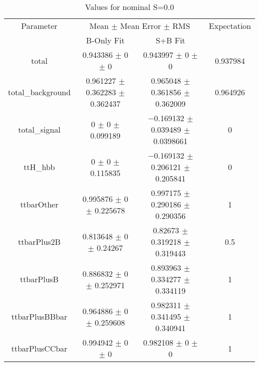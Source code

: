 \begin{table}
\centering
\caption{Values for nominal S=0.0}
\begin{tabular}{cccc}
\toprule
Parameter & \multicolumn{2}{c}{Mean $\pm$ Mean Error $\pm$ RMS} & Expectation\\
 & B-Only Fit & S+B Fit & \\
\midrule
total & \num{0.943386} $\pm$ \num{0} $\pm$ \num{0} & \num{0.943997} $\pm$ \num{0} $\pm$ \num{0} & \num{0.937984}\\
total\_background & \num{0.961227} $\pm$ \num{0.362283} $\pm$ \num{0.362437} & \num{0.965048} $\pm$ \num{0.361856} $\pm$ \num{0.362009} & \num{0.964926}\\
total\_signal & \num{0} $\pm$ \num{0} $\pm$ \num{0.099189} & \num{-0.169132} $\pm$ \num{0.039489} $\pm$ \num{0.0398661} & \num{0}\\
ttH\_hbb & \num{0} $\pm$ \num{0} $\pm$ \num{0.115835} & \num{-0.169132} $\pm$ \num{0.206121} $\pm$ \num{0.205841} & \num{0}\\
ttbarOther & \num{0.995876} $\pm$ \num{0} $\pm$ \num{0.225678} & \num{0.997175} $\pm$ \num{0.290186} $\pm$ \num{0.290356} & \num{1}\\
ttbarPlus2B & \num{0.813648} $\pm$ \num{0} $\pm$ \num{0.24267} & \num{0.82673} $\pm$ \num{0.319218} $\pm$ \num{0.319443} & \num{0.5}\\
ttbarPlusB & \num{0.886832} $\pm$ \num{0} $\pm$ \num{0.252971} & \num{0.893963} $\pm$ \num{0.334277} $\pm$ \num{0.334119} & \num{1}\\
ttbarPlusBBbar & \num{0.964886} $\pm$ \num{0} $\pm$ \num{0.259608} & \num{0.982311} $\pm$ \num{0.341495} $\pm$ \num{0.340941} & \num{1}\\
ttbarPlusCCbar & \num{0.994942} $\pm$ \num{0} $\pm$ \num{0} & \num{0.982108} $\pm$ \num{0} $\pm$ \num{0} & \num{1}\\
\bottomrule
\end{tabular}
\end{table}